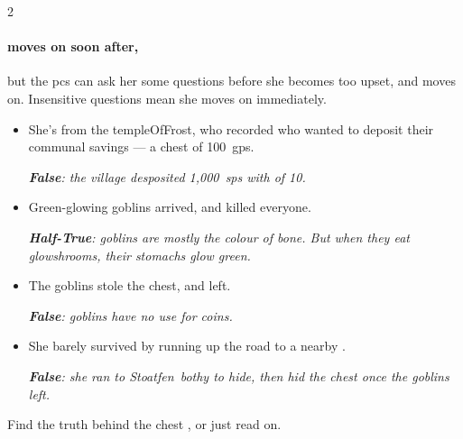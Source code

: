 \begin{multicols}{2}
\susjot


\paragraph{ moves on soon after,}
but the \glspl{pc} can ask her some questions before she becomes too upset, and moves on.
Insensitive questions mean she moves on immediately.

\begin{itemize}
  \item
  She's  from the \gls{templeOfFrost}, who recorded  who wanted to deposit their communal savings --- a chest of 100~\glspl{gp}.

  \textit{\textbf{False}: the \gls{village} desposited 1,000~\glspl{sp} with  of 10.}
  \item
  Green-glowing goblins arrived, and killed everyone.

  \textit{\textbf{Half-True}: goblins are mostly the colour of bone.
  But when they eat \glspl{glowshroom}, their stomachs glow green.}
  \item
  The goblins stole the chest, and left.

  \textit{\textbf{False}: goblins have no use for \glspl{coin}.}
  \item
  She barely survived by running up the road to a nearby .

  \textit{\textbf{False}: she ran to Stoatfen~\Gls{bothy} to hide, then hid the chest once the goblins left.}
\end{itemize}


\stopcontents[segments]

Find the truth behind the chest , or just read on.

\end{multicols}

